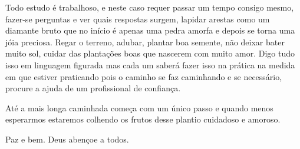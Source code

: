 \emdash{}Todo estudo é trabalhoso, e neste caso requer passar um tempo consigo mesmo, fazer-se perguntas e ver quais respostas surgem, lapidar arestas como um diamante bruto que no início é apenas uma pedra amorfa e depois se torna uma jóia preciosa. Regar o terreno, adubar, plantar boa semente, não deixar bater muito sol, cuidar das plantações boas que nascerem com muito amor. Digo tudo isso em linguagem figurada mas cada um saberá fazer isso na prática na medida em que estiver praticando pois o caminho se faz caminhando e se necessário, procure a ajuda de um profissional de confiança.

\emdash{}Até a mais longa caminhada começa com um único passo e quando menos esperarmos estaremos colhendo os frutos desse plantio cuidadoso e amoroso.

\emdash{}Paz e bem. Deus abençoe a todos.
